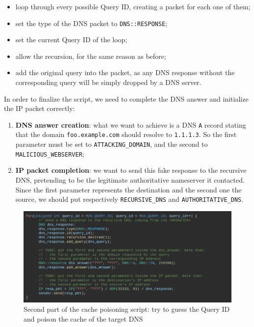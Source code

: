 \documentclass[11pt,a4paper]{article}
\begin{document}
\begin{itemize}
    \item loop through every possible Query ID, creating a packet for each one of them;
    \item set the type of the DNS packet to \texttt{DNS::RESPONSE};
    \item set the current Query ID of the loop;
    \item allow the recursion, for the same reason as before;
    \item add the original query into the packet, as any DNS response without the corresponding query will be simply dropped by a DNS server.
\end{itemize}

\noindent
In order to finalize the script, we need to complete the DNS answer and initialize the IP packet correctly:
\begin{enumerate}
    \item \textbf{DNS answer creation}: what we want to achieve is a DNS \texttt{A} record stating that the domain \texttt{foo.example.com} should resolve to \texttt{1.1.1.3}. So the first parameter must be set to \texttt{ATTACKING\_DOMAIN}, and the second to \texttt{MALICIOUS\_WEBSERVER};
    \item \textbf{IP packet completion}: we want to send this fake response to the recursive DNS, pretending to be the legitimate authoritative nameserver it contacted. Since the first parameter represents the destination and the second one the source, we should put respectively \texttt{RECURSIVE\_DNS} and \texttt{AUTHORITATIVE\_DNS}.
\end{enumerate}

\begin{figure}[h]
    \centering
    \includegraphics[width=\textwidth]{cache-poisoning-second.png}
    \caption{Second part of the cache poisoning script: try to guess the Query ID and poison the cache of the target DNS}
    \label{fig:cache-poisoning-second}
\end{figure}
\end{document}
